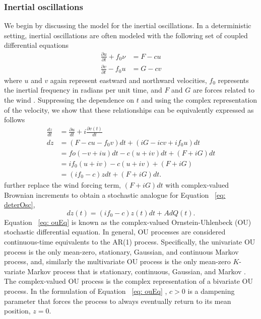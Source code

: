 \documentclass{stat572Style}
\begin{document}
\subsubsection{Inertial oscillations}
We begin by discussing the model for the inertial oscillations. 
In a deterministic setting, inertial oscillations are often modeled with the following set of coupled differential equations
\begin{align}
\label{eq: deterOsc}
\frac{\partial u }{\partial t}  + f_{0} \nu &= F - cu \\ \nonumber
\frac{\partial v}{\partial t} - f_{0}u &= G - cv
\end{align}
where $u$ and $v$ again represent eastward and northward velocities, $f_{0}$ represents the inertial frequency in radians per unit time, and $F$ and $G$ are forces related to the wind  \citep{Pollard1970}. 
Suppressing the dependence on $t$ and using the complex representation of the velocity,  we show that these relationships can be equivalently expressed as follows
\begin{align}
\label{eq:diffEqDeriv}
\frac{dz}{dt} &= \frac{\partial u}{dt} + i\frac{\partial v(t)}{dt}\\ \nonumber
dz &= (F - c u- f_{0}v)dt + (iG - icv + if_{0}u)dt\\ \nonumber
&= fo(-v + iu)dt - c(u + iv)dt + (F + iG)dt\\ \nonumber
&= if_{0}(u + iv) - c(u + iv) + (F + iG)\\ \nonumber
&= (if_{0} - c)z dt + (F + iG)dt. 
\end{align}
\citet{Sykulski2016} further replace the wind forcing term, $(F + iG)dt$  with complex-valued Brownian increments \citep{Mandelbrot1968} to obtain a stochastic analogue for Equation ~\ref{eq: deterOsc},
 \begin{equation}
\label{eq: ouEq}
dz(t) = (i f_{0} -c) z(t) dt + A d Q(t). 
\end{equation}  
Equation ~\ref{eq: ouEq}  is known as the complex-valued Ornstein-Uhlenbeck (OU) stochastic differential equation. 
In general,  OU processes are considered continuous-time equivalents to the AR(1) process. Specifically,  the univariate OU process is the only mean-zero, stationary, Gaussian, and continuous Markov process, and, similarly the multivariate OU process is the only mean-zero $K$-variate Markov process that is stationary, continuous, Gaussian, and Markov \citep{Schach1971}.
 The complex-valued OU process is the complex representation of a bivariate OU process.  
 In the formulation of Equation ~\ref{eq: ouEq} , $c > 0$ is a dampening parameter that forces the process to always eventually return to its mean position, $z = 0$.  
\end{document}
